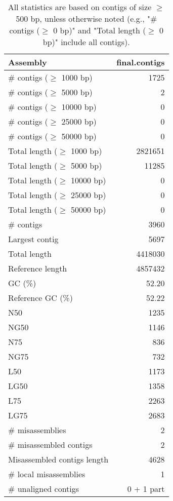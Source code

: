 \documentclass[12pt,a4paper]{article}
\begin{document}
\begin{table}[ht]
\begin{center}
\caption{All statistics are based on contigs of size $\geq$ 500 bp, unless otherwise noted (e.g., "\# contigs ($\geq$ 0 bp)" and "Total length ($\geq$ 0 bp)" include all contigs).}
\begin{tabular}{|l*{1}{|r}|}
\hline
Assembly & final.contigs \\ \hline
\# contigs ($\geq$ 1000 bp) & 1725 \\ \hline
\# contigs ($\geq$ 5000 bp) & 2 \\ \hline
\# contigs ($\geq$ 10000 bp) & 0 \\ \hline
\# contigs ($\geq$ 25000 bp) & 0 \\ \hline
\# contigs ($\geq$ 50000 bp) & 0 \\ \hline
Total length ($\geq$ 1000 bp) & 2821651 \\ \hline
Total length ($\geq$ 5000 bp) & 11285 \\ \hline
Total length ($\geq$ 10000 bp) & 0 \\ \hline
Total length ($\geq$ 25000 bp) & 0 \\ \hline
Total length ($\geq$ 50000 bp) & 0 \\ \hline
\# contigs & 3960 \\ \hline
Largest contig & 5697 \\ \hline
Total length & 4418030 \\ \hline
Reference length & 4857432 \\ \hline
GC (\%) & 52.20 \\ \hline
Reference GC (\%) & 52.22 \\ \hline
N50 & 1235 \\ \hline
NG50 & 1146 \\ \hline
N75 & 836 \\ \hline
NG75 & 732 \\ \hline
L50 & 1173 \\ \hline
LG50 & 1358 \\ \hline
L75 & 2263 \\ \hline
LG75 & 2683 \\ \hline
\# misassemblies & 2 \\ \hline
\# misassembled contigs & 2 \\ \hline
Misassembled contigs length & 4628 \\ \hline
\# local misassemblies & 1 \\ \hline
\# unaligned contigs & 0 + 1 part \\ \hline

\end{tabular}
\end{center}
\end{table}
\end{document}
